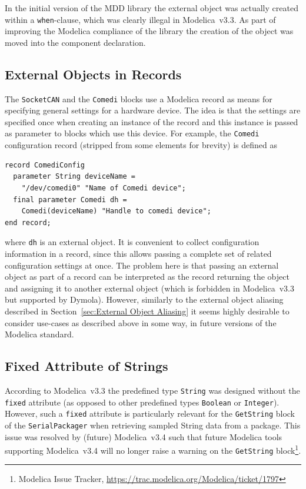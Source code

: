 \documentclass{resources/modelica}
\newcommand{\modelica}[1]{\lstinline[language=modelica]|#1|}
\begin{document}
In the initial version of the MDD library the external object was actually
created within a \modelica{when}-clause,
which was clearly illegal in Modelica~v3.3. As part of improving the Modelica
compliance of the library the creation of the object was moved into the
component declaration.

\subsection{External Objects in Records}
\label{sec:External Objects in Records}

The \modelica{SocketCAN} and the \modelica{Comedi} blocks use a Modelica record as means
for specifying general settings for a hardware device. The idea is that the
settings are specified once when creating an instance of the record and
this instance is passed as parameter to blocks which use this device. For
example, the \modelica{Comedi} configuration record (stripped from some elements for brevity) is defined
as
\begin{lstlisting}[language=modelica]
record ComediConfig
  parameter String deviceName =
    "/dev/comedi0" "Name of Comedi device";
  final parameter Comedi dh =
    Comedi(deviceName) "Handle to comedi device";
end record;
\end{lstlisting}
where \modelica{dh} is an external object. It is convenient to collect
configuration information in a record, since this allows passing a complete set
of related configuration settings at once. The problem here is that passing an
external object as part of a record can be interpreted as the record returning
the object and assigning it to another external object (which is forbidden in
Modelica~v3.3 but supported by Dymola). However, similarly to the external object aliasing described in
Section~\ref{sec:External Object Aliasing} it seems highly desirable to consider
use-cases as described above in some way, in future versions of the Modelica
standard.

\subsection{Fixed Attribute of Strings}

According to Modelica~v3.3 the predefined type \mbox{\modelica{String}} was
designed without the \modelica{fixed} attribute (as opposed to other predefined
types \modelica{Boolean} or \mbox{\modelica{Integer}).} However, such a
\modelica{fixed} attribute is particularly relevant for the \modelica{GetString}
block of the \modelica{SerialPackager} when retrieving sampled String data from
a package. This issue was resolved by (future) Modelica~v3.4 such that future
Modelica tools supporting  Modelica~v3.4 will no longer raise a warning on
the \modelica{GetString} block\footnote{Modelica Issue Tracker,
\url{https://trac.modelica.org/Modelica/ticket/1797}}.
\end{document}
